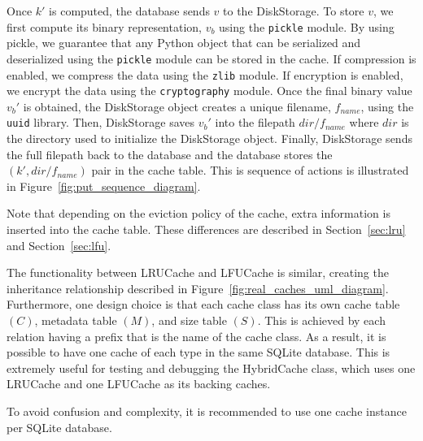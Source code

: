 \documentclass[11pt, journal]{IEEEtran}
\begin{document}
Once $k'$ is computed, the database sends $v$ to the DiskStorage.
To store $v$, we first
compute its binary representation, $v_b$ using the \texttt{pickle} module.
By using pickle, we guarantee that any Python object
that can be serialized and deserialized using
the \texttt{pickle} module can be stored in the cache.
If compression is enabled, we compress the data using the \texttt{zlib} module.
If encryption is enabled, we encrypt the data using the \texttt{cryptography}
module. Once the final binary value $v_b'$ is obtained,
the DiskStorage object creates a unique
filename, $f_{name}$, using the \texttt{uuid} library.
Then, DiskStorage saves $v_b'$ into the filepath $dir/f_{name}$ where $dir$ is the directory
used to initialize the DiskStorage object. Finally, DiskStorage sends the full filepath
back to the database and the database stores the $(k', dir/f_{name})$ pair in the cache table.
This is sequence of actions is illustrated in Figure~\ref{fig:put_sequence_diagram}.

Note that depending on the eviction policy of the cache, extra information
is inserted into the cache table. These differences are described in
Section~\ref{sec:lru} and Section~\ref{sec:lfu}.

The functionality between LRUCache and LFUCache
is similar, creating the inheritance relationship described in Figure~\ref{fig:real_caches_uml_diagram}.
Furthermore, one design choice is that each cache class has its own cache table $(C)$,
metadata table $(M)$, and size table $(S)$.
This is achieved by each relation having a prefix
that is the name of the cache class. As a result, it is possible to have
one cache of each type in the same SQLite database. This is extremely useful
for testing and debugging the HybridCache class,
which uses one LRUCache and one LFUCache
as its backing caches.

\begin{tcolorbox}[colback=blue!5!white, colframe=blue!75!black, title=Note]
    To avoid confusion and complexity, it is recommended to use
    one cache instance per SQLite database.
\end{tcolorbox}
\end{document}
